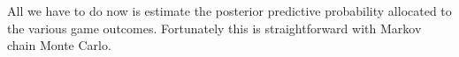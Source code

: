 \documentclass[
  letterpaper,
  DIV=11,
  numbers=noendperiod]{scrartcl}
\newenvironment{Shaded}{\begin{snugshade}}{\end{snugshade}}
\newcommand{\DecValTok}[1]{\textcolor[rgb]{0.68,0.00,0.00}{#1}}
\newcommand{\FunctionTok}[1]{\textcolor[rgb]{0.28,0.35,0.67}{#1}}
\newcommand{\NormalTok}[1]{\textcolor[rgb]{0.00,0.23,0.31}{#1}}
\newcommand{\OtherTok}[1]{\textcolor[rgb]{0.00,0.23,0.31}{#1}}
\newcommand{\SpecialCharTok}[1]{\textcolor[rgb]{0.37,0.37,0.37}{#1}}
\begin{document}
All we have to do now is estimate the posterior predictive probability
allocated to the various game outcomes. Fortunately this is
straightforward with Markov chain Monte Carlo.

\begin{Shaded}
\end{Shaded}
\end{document}
